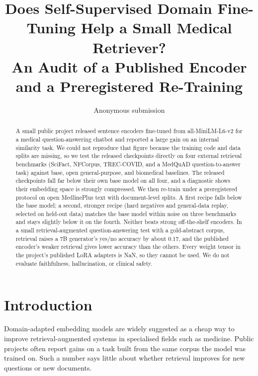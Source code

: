 \documentclass[11pt]{article}
\title{Does Self-Supervised Domain Fine-Tuning Help a Small Medical Retriever?\\
An Audit of a Published Encoder and a Preregistered Re-Training}
\author{Anonymous submission}
\begin{document}
\maketitle

\begin{abstract}
A small public project released sentence encoders fine-tuned from all-MiniLM-L6-v2 for a medical question-answering chatbot and reported a large gain on an internal similarity task. We could not reproduce that figure because the training code and data splits are missing, so we test the released checkpoints directly on four external retrieval benchmarks (SciFact, NFCorpus, TREC-COVID, and a MedQuAD question-to-answer task) against base, open general-purpose, and biomedical baselines. The released checkpoints fall far below their own base model on all four, and a diagnostic shows their embedding space is strongly compressed. We then re-train under a preregistered protocol on open MedlinePlus text with document-level splits. A first recipe falls below the base model; a second, stronger recipe (hard negatives and general-data replay, selected on held-out data) matches the base model within noise on three benchmarks and stays slightly below it on the fourth. Neither beats strong off-the-shelf encoders. In a small retrieval-augmented question-answering test with a gold-abstract corpus, retrieval raises a 7B generator's yes/no accuracy by about 0.17, and the published encoder's weaker retrieval gives lower accuracy than the others. Every weight tensor in the project's published LoRA adapters is NaN, so they cannot be used. We do not evaluate faithfulness, hallucination, or clinical safety.
\end{abstract}

\section{Introduction}
Domain-adapted embedding models are widely suggested as a cheap way to improve retrieval-augmented systems in specialised fields such as medicine. Public projects often report gains on a task built from the same corpus the model was trained on. Such a number says little about whether retrieval improves for new questions or new documents.
\end{document}

